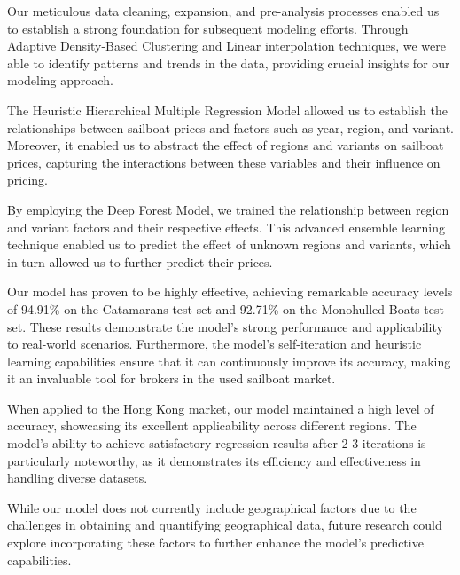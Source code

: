 \documentclass[12pt]{article}  %
\begin{document}
Our meticulous data cleaning, expansion, and pre-analysis processes enabled us to establish a strong foundation for subsequent modeling efforts. Through Adaptive Density-Based Clustering and Linear interpolation techniques, we were able to identify patterns and trends in the data, providing crucial insights for our modeling approach.

The Heuristic Hierarchical Multiple Regression Model allowed us to establish the relationships between sailboat prices and factors such as year, region, and variant. Moreover, it enabled us to abstract the effect of regions and variants on sailboat prices, capturing the interactions between these variables and their influence on pricing.

By employing the Deep Forest Model, we trained the relationship between region and variant factors and their respective effects. This advanced ensemble learning technique enabled us to predict the effect of unknown regions and variants, which in turn allowed us to further predict their prices.

Our model has proven to be highly effective, achieving remarkable accuracy levels of 94.91\% on the Catamarans test set and 92.71\% on the Monohulled Boats test set. These results demonstrate the model's strong performance and applicability to real-world scenarios. Furthermore, the model's self-iteration and heuristic learning capabilities ensure that it can continuously improve its accuracy, making it an invaluable tool for brokers in the used sailboat market.

When applied to the Hong Kong market, our model maintained a high level of accuracy, showcasing its excellent applicability across different regions. The model's ability to achieve satisfactory regression results after 2-3 iterations is particularly noteworthy, as it demonstrates its efficiency and effectiveness in handling diverse datasets.

While our model does not currently include geographical factors due to the challenges in obtaining and quantifying geographical data, future research could explore incorporating these factors to further enhance the model's predictive capabilities.
\end{document}
